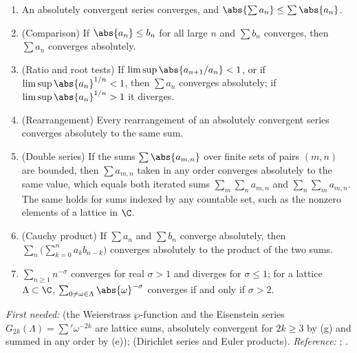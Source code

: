 \begin{theorem}\label{thm:prereq:series}
\begin{enumerate}[label=(\alph*)]
\item An absolutely convergent series converges, and $\abs{\sum a_n}\le\sum\abs{a_n}$.
\item (Comparison) If $\abs{a_n}\le b_n$ for all large $n$ and $\sum b_n$ converges, then
$\sum a_n$ converges absolutely.
\item (Ratio and root tests) If $\limsup\abs{a_{n+1}/a_n}<1$, or if $\limsup\abs{a_n}^{1/n}<1$,
then $\sum a_n$ converges absolutely; if $\limsup\abs{a_n}^{1/n}>1$ it diverges.
\item (Rearrangement) Every rearrangement of an absolutely convergent series converges absolutely
to the same sum.
\item (Double series) If the sums $\sum\abs{a_{m,n}}$ over finite sets of pairs $(m,n)$ are bounded,
then $\sum a_{m,n}$ taken in any order converges absolutely to the same value, which equals both
iterated sums $\sum_m\sum_n a_{m,n}$ and $\sum_n\sum_m a_{m,n}$. The same holds for sums indexed
by any countable set, such as the nonzero elements of a lattice in $\C$.
\item (Cauchy product) If $\sum a_n$ and $\sum b_n$ converge absolutely, then
$\sum_n\bigl(\sum_{k=0}^n a_kb_{n-k}\bigr)$ converges absolutely to the product of the two sums.
\item $\sum_{n\ge1}n^{-\sigma}$ converges for real $\sigma>1$ and diverges for $\sigma\le1$; for a
lattice $\Lambda\subset\C$, $\sum_{0\ne\omega\in\Lambda}\abs{\omega}^{-\sigma}$ converges if and
only if $\sigma>2$.
\end{enumerate}
\end{theorem}
\noindent\emph{First needed:}  (the Weierstrass $\wp$-function and the Eisenstein
series $G_{2k}(\Lambda)=\sum'\omega^{-2k}$ are lattice sums, absolutely convergent for $2k\ge3$ by
(g) and summed in any order by (e));  (Dirichlet series and Euler products).
\emph{Reference:} \cite[Chapter 3]{Rudin76}; \cite[Chapter 8]{Apostol74}.


